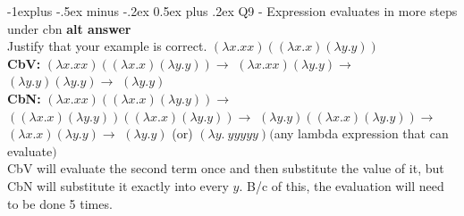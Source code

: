 \documentclass[letterpaper, 8pt]{extarticle}
\makeatletter
\renewcommand{\subsection}{\@startsection{subsection}{2}{0mm}%
                                {-1explus -.5ex minus -.2ex}%
                                {0.5ex plus .2ex}%
                                {\normalfont\small\bfseries}}
\makeatother
\begin{document}
\begin{multicols*}{4}
    \subsection{Q9 - Expression evaluates in more steps under cbn}
    \textbf{alt answer} \\
    Justify that your example is correct.
    $(\lambda x . x x ) (( \lambda x . x) (\lambda y.y))$\\
    \textbf{CbV:}
    $(\lambda x . x x) (( \lambda x .x ) (\lambda y .y )) \to$
    $(\lambda x . xx) (\lambda y .y )\to$
    $(\lambda y .y ) (\lambda y .y ) \to$
    $(\lambda y . y)$\\
    \textbf{CbN:}
    $(\lambda x . xx) (( \lambda x . x) (\lambda y . y))\to$
    $((\lambda x . x) (\lambda y. y)) ((\lambda x .x) (\lambda y .y))\to$
    $(\lambda y.y) ((\lambda x . x) ( \lambda y .y))\to$
    $(\lambda x .x) (\lambda y .y)\to$
    $(\lambda y .y)$
    (or)
    $(\lambda y.\ y y y y y)($any lambda expression that can evaluate$)$ \\
    CbV will evaluate the second term once and then substitute the value of it, but CbN will substitute it exactly into every $y$. B/c of this, the evaluation will need to be done 5 times.


\end{multicols*}
\end{document}
